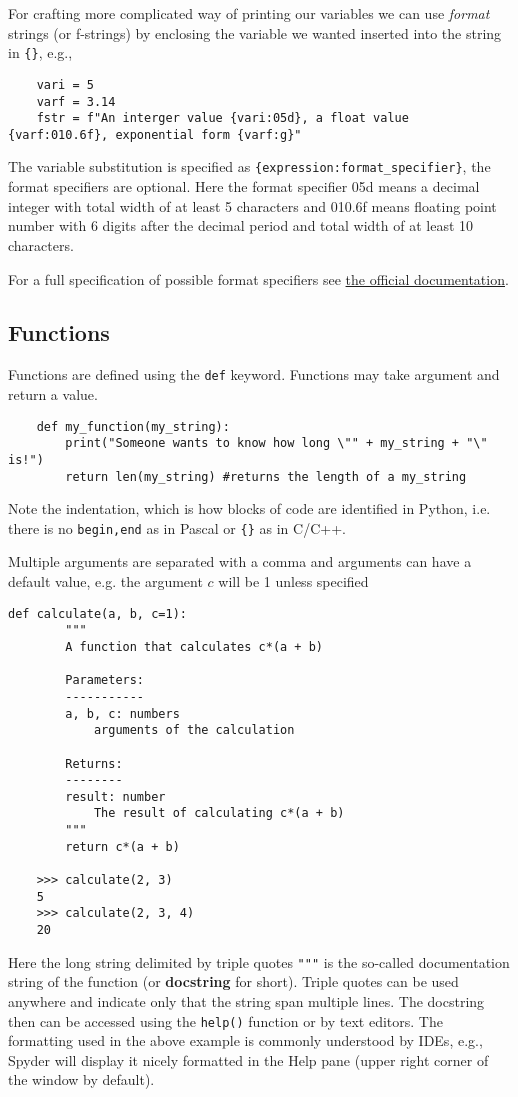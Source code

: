 For crafting more complicated way of printing our variables we can use \emph{format} strings (or f-strings) by enclosing the variable we wanted inserted into the string in \verb|{}|, e.g.,
\begin{lstlisting}
    vari = 5
    varf = 3.14
    fstr = f"An interger value {vari:05d}, a float value {varf:010.6f}, exponential form {varf:g}"
\end{lstlisting}
The variable substitution is specified as \verb|{expression:format_specifier}|, the format specifiers are optional. Here the format specifier 05d means a decimal integer with total width of at least 5 characters and 010.6f means floating point number with 6 digits after the decimal period and total width of at least 10 characters.

For a full specification of possible format specifiers see \href{https://docs.python.org/3/library/string.html#formatspec}{the official documentation}.

\subsection{Functions}
Functions are defined using the \verb|def| keyword. Functions may take argument and return a value.
\begin{lstlisting}
    def my_function(my_string):
        print("Someone wants to know how long \"" + my_string + "\" is!")
        return len(my_string) #returns the length of a my_string
\end{lstlisting}
Note the indentation, which is how blocks of code are identified in Python, i.e. there is no \verb|begin,end| as in Pascal or \verb|{}| as in C/C++.

Multiple arguments are separated with a comma and arguments can have a default value, e.g. the argument $c$ will be 1 unless specified
\begin{lstlisting}[caption=Function definition]
    def calculate(a, b, c=1):
        """
        A function that calculates c*(a + b)

        Parameters:
        -----------
        a, b, c: numbers
            arguments of the calculation

        Returns:
        --------
        result: number
            The result of calculating c*(a + b)
        """
        return c*(a + b)

    >>> calculate(2, 3)
    5
    >>> calculate(2, 3, 4)
    20
\end{lstlisting}
Here the long string delimited by triple quotes \lstinline{"""} is the so-called documentation string of the function (or \textbf{docstring} for short). Triple quotes can be used anywhere and indicate only that the string span multiple lines. The docstring then can be accessed using the \lstinline{help()} function or by text editors. The formatting used in the above example is commonly understood by IDEs, e.g., Spyder will display it nicely formatted in the Help pane (upper right corner of the window by default).

